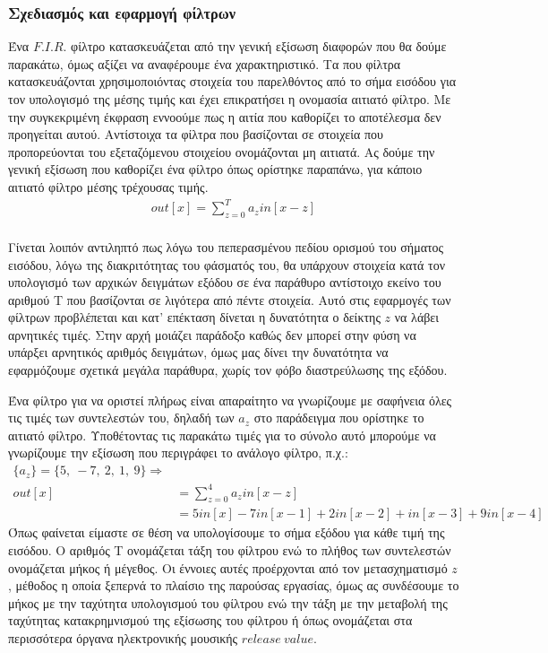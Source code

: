 \documentclass[breaklines=true, 12pt]{article}
\begin{document}
\subsubsection{Σχεδιασμός και εφαρμογή φίλτρων}
\label{sec:org68466f6}
Ένα \(F.I.R.\) φίλτρο κατασκευάζεται από την γενική εξίσωση διαφορών που θα δούμε παρακάτω,
όμως αξίζει να αναφέρουμε ένα χαρακτηριστικό. Τα που φίλτρα κατασκευάζονται χρησιμοποιόντας
στοιχεία του παρελθόντος από το σήμα εισόδου για τον υπολογισμό της μέσης τιμής και
έχει επικρατήσει η ονομασία αιτιατό φίλτρο. Με την συγκεκριμένη έκφραση εννοούμε πως
η αιτία που καθορίζει το αποτέλεσμα δεν προηγείται αυτού. Αντίστοιχα τα φίλτρα που
βασίζονται σε στοιχεία που προπορεύονται του εξεταζόμενου στοιχείου ονομάζονται μη
αιτιατά. Ας δούμε την γενική εξίσωση που καθορίζει ένα φίλτρο όπως ορίστηκε παραπάνω,
για κάποιο αιτιατό φίλτρο μέσης τρέχουσας τιμής.
\begin{equation}
\begin{align}
out[x] = \sum_{z=0}^{{T}} a_{z} in[x-z] \\
\end{align}
\end{equation}

Γίνεται λοιπόν αντιληπτό πως λόγω του πεπερασμένου πεδίου ορισμού του σήματος εισόδου,
λόγω της διακριτότητας του φάσματός του, θα υπάρχουν στοιχεία κατά τον υπολογισμό των
αρχικών δειγμάτων εξόδου σε ένα παράθυρο αντίστοιχο εκείνο του αριθμού Τ που βασίζονται
σε λιγότερα από πέντε στοιχεία. Αυτό στις εφαρμογές των φίλτρων προβλέπεται και κατ'
επέκταση δίνεται η δυνατότητα ο δείκτης \(z\) να λάβει αρνητικές τιμές. Στην αρχή μοιάζει
παράδοξο καθώς δεν μπορεί στην φύση να υπάρξει αρνητικός αριθμός δειγμάτων, όμως μας
δίνει την δυνατότητα να εφαρμόζουμε σχετικά μεγάλα παράθυρα, χωρίς τον φόβο διαστρεύλωσης
της εξόδου.

Ένα φίλτρο για να οριστεί πλήρως είναι απαραίτητο να γνωρίζουμε με σαφήνεια όλες τις
τιμές των συντελεστών του, δηλαδή των \(a_{z}\) στο παράδειγμα που ορίστηκε το αιτιατό φίλτρο.
Υποθέτοντας τις παρακάτω τιμές για το σύνολο αυτό μπορούμε να γνωρίζουμε την εξίσωση
που περιγράφει το ανάλογο φίλτρο, π.χ.:
\begin{equation}
\begin{align}
\{a_{z}\} = \{5,\ -7,\ 2,\ 1,\ 9\} \Rightarrow \\
out[x] &= \sum_{z=0}^{4}a_{z}in[x-z] \\
&= 5in[x] - 7in[x-1] + 2in[x-2] + in[x-3] +9in[x-4]
\end{align}
\end{equation}
Όπως φαίνεται είμαστε σε θέση να υπολογίσουμε το σήμα εξόδου για κάθε τιμή της εισόδου.
Ο αριθμός Τ ονομάζεται τάξη του φίλτρου ενώ το πλήθος των συντελεστών ονομάζεται μήκος ή
μέγεθος. Οι έννοιες αυτές προέρχονται από τον μετασχηματισμό \(z\), μέθοδος η οποία  ξεπερνά
το πλαίσιο της παρούσας εργασίας, όμως ας συνδέσουμε το μήκος με την ταχύτητα υπολογισμού
του φίλτρου ενώ την τάξη με την μεταβολή της ταχύτητας κατακρημνισμού της εξίσωσης του
φίλτρου ή όπως ονομάζεται στα περισσότερα όργανα ηλεκτρονικής μουσικής \(release\ value\).
\end{document}
